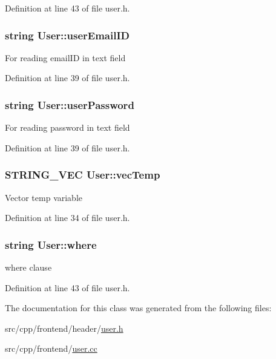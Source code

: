 Definition at line 43 of file user.\-h.

\hypertarget{classUser_a18c8f47943a8ebefcdaa709636a53e81}{
\subsubsection[{user\-Email\-I\-D}]{\setlength{\rightskip}{0pt plus 5cm}string User\-::user\-Email\-I\-D\hspace{0.3cm}{\ttfamily [protected]}}}\label{classUser_a18c8f47943a8ebefcdaa709636a53e81}
For reading email\-I\-D in text field 

Definition at line 39 of file user.\-h.

\hypertarget{classUser_aabe10090d6867d81bc17dd6c362196e8}{
\subsubsection[{user\-Password}]{\setlength{\rightskip}{0pt plus 5cm}string User\-::user\-Password\hspace{0.3cm}{\ttfamily [protected]}}}\label{classUser_aabe10090d6867d81bc17dd6c362196e8}
For reading password in text field 

Definition at line 39 of file user.\-h.

\hypertarget{classUser_addb446e2ea86d984e243909311967052}{
\subsubsection[{vec\-Temp}]{\setlength{\rightskip}{0pt plus 5cm}S\-T\-R\-I\-N\-G\-\_\-\-V\-E\-C User\-::vec\-Temp\hspace{0.3cm}{\ttfamily [protected]}}}\label{classUser_addb446e2ea86d984e243909311967052}
Vector temp variable 

Definition at line 34 of file user.\-h.

\hypertarget{classUser_aaa4322929700c09aad2594331d3c2071}{
\subsubsection[{where}]{\setlength{\rightskip}{0pt plus 5cm}string User\-::where\hspace{0.3cm}{\ttfamily [protected]}}}\label{classUser_aaa4322929700c09aad2594331d3c2071}
where clause 

Definition at line 43 of file user.\-h.



The documentation for this class was generated from the following files\-:\begin{DoxyCompactItemize}
\item 
src/cpp/frontend/header/\hyperlink{user_8h}{user.\-h}\item 
src/cpp/frontend/\hyperlink{user_8cc}{user.\-cc}\end{DoxyCompactItemize}
